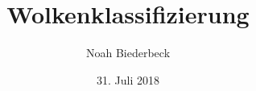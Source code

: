 

\subject{Machine Learning for Physicists}
\title{Wolkenklassifizierung}

\author{%
  Noah Biederbeck%
}
\date{%
  31. Juli 2018
}



\maketitle
\thispagestyle{empty}
\tableofcontents
\newpage



